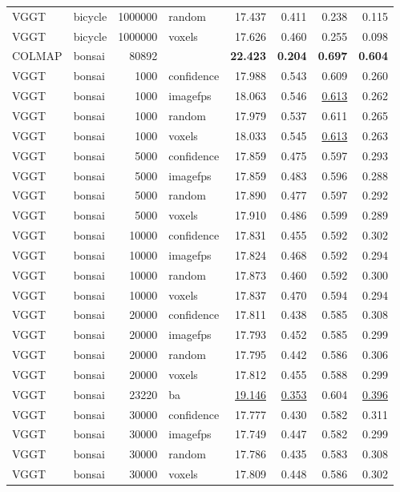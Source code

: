 \begin{table}[H]
\begin{tabular}{llrlrrrr}
VGGT & bicycle & 1000000 & random & 17.437 & 0.411 & 0.238 & 0.115 \\
VGGT & bicycle & 1000000 & voxels & 17.626 & 0.460 & 0.255 & 0.098 \\
\midrule
COLMAP & bonsai & 80892 &  & \textbf{22.423} & \textbf{0.204} & \textbf{0.697} & \textbf{0.604} \\
VGGT & bonsai & 1000 & confidence & 17.988 & 0.543 & 0.609 & 0.260 \\
VGGT & bonsai & 1000 & imagefps & 18.063 & 0.546 & \underline{0.613} & 0.262 \\
VGGT & bonsai & 1000 & random & 17.979 & 0.537 & 0.611 & 0.265 \\
VGGT & bonsai & 1000 & voxels & 18.033 & 0.545 & \underline{0.613} & 0.263 \\
VGGT & bonsai & 5000 & confidence & 17.859 & 0.475 & 0.597 & 0.293 \\
VGGT & bonsai & 5000 & imagefps & 17.859 & 0.483 & 0.596 & 0.288 \\
VGGT & bonsai & 5000 & random & 17.890 & 0.477 & 0.597 & 0.292 \\
VGGT & bonsai & 5000 & voxels & 17.910 & 0.486 & 0.599 & 0.289 \\
VGGT & bonsai & 10000 & confidence & 17.831 & 0.455 & 0.592 & 0.302 \\
VGGT & bonsai & 10000 & imagefps & 17.824 & 0.468 & 0.592 & 0.294 \\
VGGT & bonsai & 10000 & random & 17.873 & 0.460 & 0.592 & 0.300 \\
VGGT & bonsai & 10000 & voxels & 17.837 & 0.470 & 0.594 & 0.294 \\
VGGT & bonsai & 20000 & confidence & 17.811 & 0.438 & 0.585 & 0.308 \\
VGGT & bonsai & 20000 & imagefps & 17.793 & 0.452 & 0.585 & 0.299 \\
VGGT & bonsai & 20000 & random & 17.795 & 0.442 & 0.586 & 0.306 \\
VGGT & bonsai & 20000 & voxels & 17.812 & 0.455 & 0.588 & 0.299 \\
VGGT & bonsai & 23220 & ba & \underline{19.146} & \underline{0.353} & 0.604 & \underline{0.396} \\
VGGT & bonsai & 30000 & confidence & 17.777 & 0.430 & 0.582 & 0.311 \\
VGGT & bonsai & 30000 & imagefps & 17.749 & 0.447 & 0.582 & 0.299 \\
VGGT & bonsai & 30000 & random & 17.786 & 0.435 & 0.583 & 0.308 \\
VGGT & bonsai & 30000 & voxels & 17.809 & 0.448 & 0.586 & 0.302 \\

\end{tabular}
\end{table}
